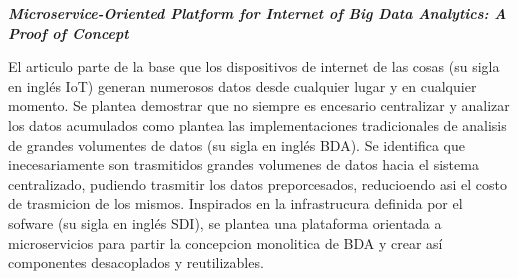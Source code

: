
\textbf{\emph{Microservice-Oriented Platform for Internet of Big
Data Analytics: A Proof of Concept}} \cite{li_microservice-oriented_2019} 
 
El articulo parte de la base que los dispositivos de internet de las cosas (su sigla en inglés IoT) generan numerosos datos desde cualquier lugar y en cualquier momento. Se plantea demostrar que no siempre es encesario centralizar y analizar los datos acumulados como plantea las implementaciones tradicionales de analisis de grandes volumentes de datos (su sigla en inglés BDA).
Se identifica que inecesariamente son trasmitidos grandes volumenes de datos hacia el sistema centralizado, pudiendo trasmitir los datos preporcesados, reducioendo asi el costo de trasmicion de los mismos. Inspirados en la infrastrucura definida por el sofware (su sigla en inglés SDI), se plantea una plataforma orientada a microservicios para partir la concepcion monolitica de BDA y crear así componentes desacoplados y reutilizables.